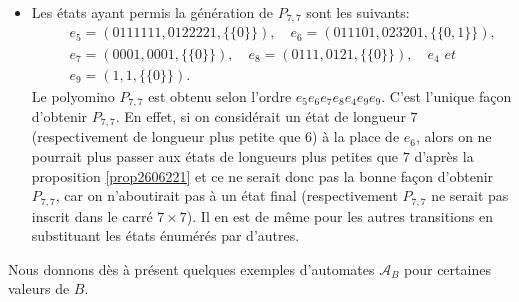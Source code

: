 \begin{Ex}
\begin{itemize}
\item Les états ayant permis la génération de $P_{7,7}$ sont les suivants:
\begin{eqnarray*}
& & e_{5}=(0111111,0122221,\{\{0\}\}), \quad e_{6}=(011101,023201,\{\{0,1\}\}),\\
& & e_{7}=(0001,0001,\{\{0\}\}),\quad e_{8}=(0111,0121,\{\{0\}\}),\quad  e_{4} \textit{ et }\\
& & e_{9}=(1,1,\{\{0\}\}).
\end{eqnarray*}
Le polyomino $P_{7,7}$ est obtenu selon l'ordre $e_{5}e_{6}e_{7}e_{8}e_{4}e_{9}e_{9}$. C'est l'unique façon d'obtenir $P_{7,7}$. En effet, si on  considérait un état de longueur $7$ (respectivement de longueur plus petite que $6$) à la place de $e_{6}$, alors on ne pourrait plus passer aux états de longueurs plus petites que $7$  d'après la proposition \ref{prop2606221} et ce ne serait donc pas la bonne façon d'obtenir $P_{7,7}$, car on n'aboutirait pas à un état final (respectivement $P_{7,7}$ ne serait pas inscrit  dans le carré $7\times7$). Il en est de même pour les autres transitions en substituant les états énumérés par d'autres.
\end{itemize}
\end{Ex}
Nous donnons dès à présent  quelques exemples d'automates $\mathcal{A}_{B}$ pour  certaines valeurs de $B$.
